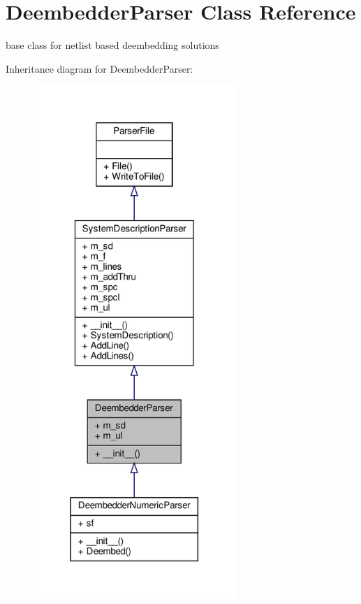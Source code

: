 \hypertarget{classSignalIntegrity_1_1Parsers_1_1DeembedderParser_1_1DeembedderParser}{}\section{Deembedder\+Parser Class Reference}
\label{classSignalIntegrity_1_1Parsers_1_1DeembedderParser_1_1DeembedderParser}


base class for netlist based deembedding solutions  




Inheritance diagram for Deembedder\+Parser\+:\nopagebreak
\begin{figure}[H]
\begin{center}
\leavevmode
\includegraphics[height=550pt]{classSignalIntegrity_1_1Parsers_1_1DeembedderParser_1_1DeembedderParser__inherit__graph}
\end{center}
\end{figure}


